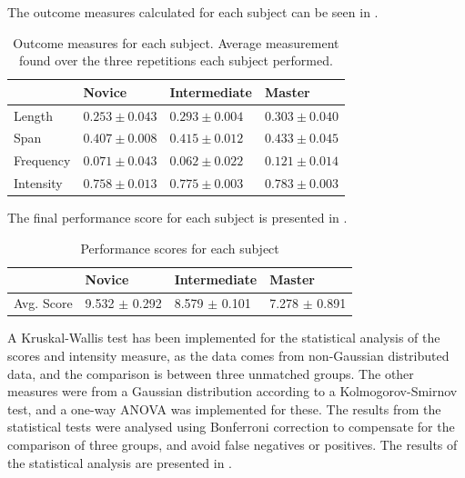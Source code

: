 

The outcome measures calculated for each subject can be seen in .

\begin{table}[h]
	\begin{tabular}{|l|l|l|l|}
		\hline
		& Novice            & Intermediate      & Master            \\ \hline
		Length    & $0.253 \pm 0.043$ & $0.293 \pm 0.004$ & $0.303 \pm 0.040$ \\ \hline
		Span      & $0.407 \pm 0.008$ & $0.415 \pm 0.012$ & $0.433 \pm 0.045$ \\ \hline
		Frequency & $0.071 \pm 0.043$ & $0.062 \pm 0.022$ & $0.121 \pm 0.014$ \\ \hline
		Intensity & $0.758 \pm 0.013$ & $0.775 \pm 0.003$ & $0.783 \pm 0.003$ \\ \hline
	\end{tabular}
	\caption{Outcome measures for each subject. Average measurement found over the three repetitions each subject performed.}
	\label{tab:measures}
\end{table}

The final performance score for each subject is presented in .

\begin{table}[h]
	\begin{tabular}{|l|l|l|l|}
		\hline
				          & Novice                     & Intermediate           & Master                   \\  \hline
		Avg. Score & 9.532 $\pm$ 0.292 & 8.579 $\pm$ 0.101 & 7.278 $\pm$ 0.891 \\ \hline
	\end{tabular}
\caption{Performance scores for each subject}
\label{tab:scores}
\end{table}

A Kruskal-Wallis test has been implemented for the statistical analysis of the scores and intensity measure, as the data comes from non-Gaussian distributed data, and the comparison is between three unmatched groups. The other measures were from a Gaussian distribution according to a Kolmogorov-Smirnov test, and a one-way ANOVA was implemented for these. The results from the statistical tests were analysed using Bonferroni correction to compensate for the comparison of three groups, and avoid false negatives or positives. The results of the statistical analysis are presented in .

